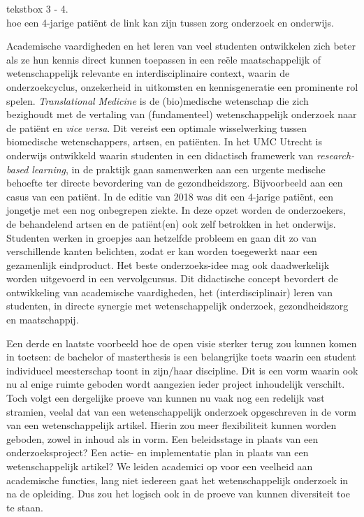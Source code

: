 \documentclass{jote-book}
\begin{document}
	\begin{bookbox}{\raggedright tekstbox 3 - 4. \\hoe een 4-jarige patiënt de link kan zijn tussen zorg onderzoek en onderwijs.}
		Academische vaardigheden en het leren van veel studenten ontwikkelen zich beter als ze hun kennis direct kunnen toepassen in een reële maatschappelijk of wetenschappelijk relevante en interdisciplinaire context, waarin de onderzoekcyclus, onzekerheid in uitkomsten en kennisgeneratie een prominente rol spelen. \emph{Translational}\emph{ }\emph{Medicine} is de (bio)medische wetenschap die zich bezighoudt met de vertaling van (fundamenteel) wetenschappelijk onderzoek naar de patiënt en \emph{vice}\emph{ versa}. Dit vereist een optimale wisselwerking tussen biomedische wetenschappers, artsen, en patiënten. In het UMC Utrecht is onderwijs ontwikkeld waarin studenten in een didactisch framewerk van \emph{research-}\emph{based}\emph{ }\emph{learning}, in de praktijk gaan samenwerken aan een urgente medische behoefte ter directe bevordering van de gezondheidszorg. Bijvoorbeeld aan een casus van een patiënt. In de editie van 2018 was dit een 4-jarige patiënt, een jongetje met een nog onbegrepen ziekte. In deze opzet worden de onderzoekers, de behandelend artsen en de patiënt(en) ook zelf betrokken in het onderwijs. Studenten werken in groepjes aan hetzelfde probleem en gaan dit zo van verschillende kanten belichten, zodat er kan worden toegewerkt naar een gezamenlijk eindproduct. Het beste onderzoeks-idee mag ook daadwerkelijk worden uitgevoerd in een vervolgcursus. Dit didactische concept bevordert de ontwikkeling van academische vaardigheden, het (interdisciplinair) leren van studenten, in directe synergie met wetenschappelijk onderzoek, gezondheidszorg en maatschappij.
	\end{bookbox}

	Een derde en laatste voorbeeld hoe de open visie sterker terug zou kunnen komen in toetsen: de bachelor of masterthesis is een belangrijke toets waarin een student individueel meesterschap toont in zijn/haar discipline. Dit is een vorm waarin ook nu al enige ruimte geboden wordt aangezien ieder project inhoudelijk verschilt. Toch volgt een dergelijke proeve van kunnen nu vaak nog een redelijk vast stramien, veelal dat van een wetenschappelijk onderzoek opgeschreven in de vorm van een wetenschappelijk artikel. Hierin zou meer flexibiliteit kunnen worden geboden, zowel in inhoud als in vorm. Een beleidsstage in plaats van een onderzoeksproject? Een actie- en implementatie plan in plaats van een wetenschappelijk artikel? We leiden academici op voor een veelheid aan academische functies, lang niet iedereen gaat het wetenschappelijk onderzoek in na de opleiding. Dus zou het logisch ook in de proeve van kunnen diversiteit toe te staan.
\end{document}
